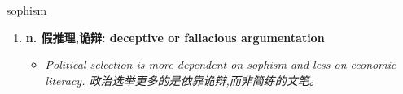 
\begin{frame}
{\huge sophism}
\begin{center}
\begin{enumerate}\Large
  \item \textbf{n. 假推理,诡辩: deceptive or fallacious argumentation}
  \begin{itemize}
    \item \em{\Large{Political selection is more dependent on sophism and less on economic literacy. 政治选举更多的是依靠诡辩,而非简练的文笔。}}
  \end{itemize}
\end{enumerate}
\end{center}
\end{frame}
